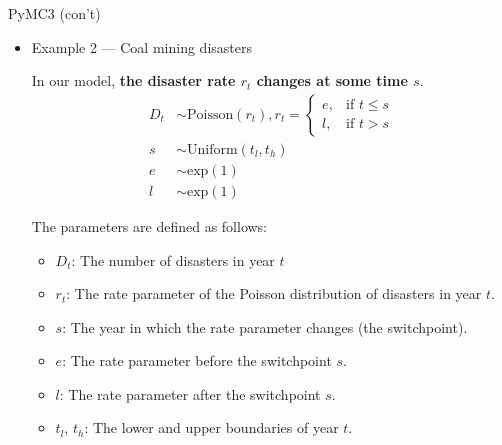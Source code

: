 \documentclass[20pt]{beamer}
\begin{document}
\begin{frame}{PyMC3 (con't)}
\begin{itemize}

  \item Example 2 --- Coal mining disasters

In our model, \textbf{the disaster rate $r_t$ changes at some time $s$}.
\begin{align*}
  D_t &\sim \text{Poisson}(r_t), r_t= \begin{cases}
   e, & \text{if } t \le s \\
   l, & \text{if } t > s
   \end{cases} \\
  s &\sim \text{Uniform}(t_l, t_h)\\
  e &\sim \text{exp}(1)\\
  l &\sim \text{exp}(1)
\end{align*}

The parameters are defined as follows:
  \begin{itemize}
   \item $D_t$: The number of disasters in year $t$
   \item $r_t$: The rate parameter of the Poisson distribution of disasters in year $t$.
   \item $s$: The year in which the rate parameter changes (the switchpoint).
   \item $e$: The rate parameter before the switchpoint $s$.
   \item $l$: The rate parameter after the switchpoint $s$.
   \item $t_l$, $t_h$: The lower and upper boundaries of year $t$.
  \end{itemize}
\end{itemize}
\end{frame}
\end{document}
